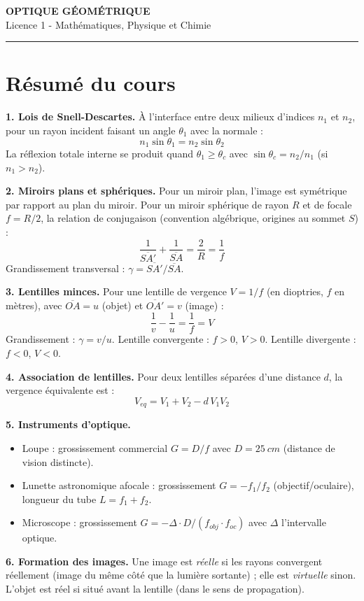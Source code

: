 \documentclass[12pt,a4paper]{article}
\begin{document}
\fi

\begin{center}
  {\LARGE\bfseries OPTIQUE GÉOMÉTRIQUE}\\[0.3cm]
  {\normalsize Licence 1 - Mathématiques, Physique et Chimie}\\[0.1cm]
  \rule{0.7\textwidth}{0.8pt}
\end{center}

\section*{Résumé du cours}

\begin{boiteresume}

\textbf{1. Lois de Snell-Descartes.} À l'interface entre deux milieux d'indices $n_1$ et $n_2$, pour un rayon incident faisant un angle $\theta_1$ avec la normale :
\[
n_1\sin\theta_1 = n_2\sin\theta_2
\]
La réflexion totale interne se produit quand $\theta_1 \geq \theta_c$ avec $\sin\theta_c = n_2/n_1$ (si $n_1 > n_2$).

\textbf{2. Miroirs plans et sphériques.} Pour un miroir plan, l'image est symétrique par rapport au plan du miroir. Pour un miroir sphérique de rayon $R$ et de focale $f = R/2$, la relation de conjugaison (convention algébrique, origines au sommet $S$) :
\[
\frac{1}{\overline{SA'}} + \frac{1}{\overline{SA}} = \frac{2}{R} = \frac{1}{f}
\]
Grandissement transversal : $\gamma = \overline{SA'}/\overline{SA}$.

\textbf{3. Lentilles minces.} Pour une lentille de vergence $V = 1/f$ (en dioptries, $f$ en mètres), avec $\overline{OA}=u$ (objet) et $\overline{OA'}=v$ (image) :
\[
\frac{1}{v} - \frac{1}{u} = \frac{1}{f} = V
\]
Grandissement : $\gamma = v/u$. Lentille convergente : $f > 0$, $V > 0$. Lentille divergente : $f < 0$, $V < 0$.

\textbf{4. Association de lentilles.} Pour deux lentilles séparées d'une distance $d$, la vergence équivalente est :
\[
V_{eq} = V_1 + V_2 - d\,V_1 V_2
\]

\textbf{5. Instruments d'optique.}
\begin{itemize}
  \item Loupe : grossissement commercial $G = D/f$ avec $D = \qty{25}{cm}$ (distance de vision distincte).
  \item Lunette astronomique afocale : grossissement $G = -f_1/f_2$ (objectif/oculaire), longueur du tube $L = f_1 + f_2$.
  \item Microscope : grossissement $G = -\Delta \cdot D/(f_{obj} \cdot f_{oc})$ avec $\Delta$ l'intervalle optique.
\end{itemize}

\textbf{6. Formation des images.}
Une image est \textit{réelle} si les rayons convergent réellement (image du même côté que la lumière sortante) ; elle est \textit{virtuelle} sinon. L'objet est réel si situé avant la lentille (dans le sens de propagation).

\end{boiteresume}
\end{document}
